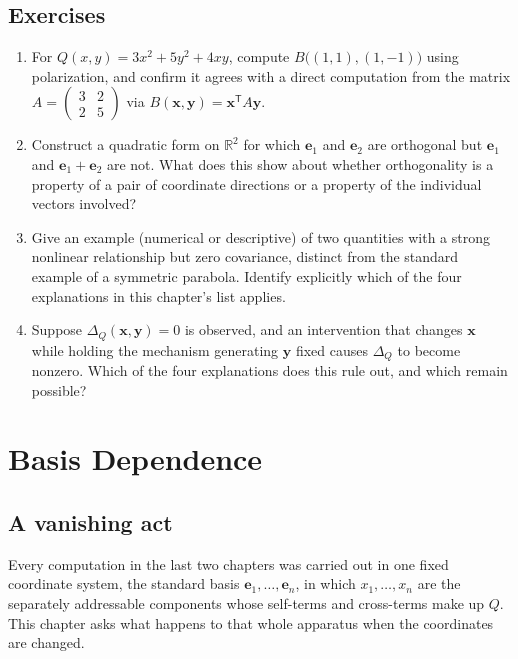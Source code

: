 \documentclass[11pt]{book}
\begin{document}
\section*{Exercises}
\begin{enumerate}
\item For $Q(x,y)=3x^2+5y^2+4xy$, compute $B\bigl((1,1),(1,-1)\bigr)$ using polarization, and confirm it agrees with a direct computation from the matrix $A=\begin{pmatrix}3&2\\2&5\end{pmatrix}$ via $B(\mathbf{x},\mathbf{y})=\mathbf{x}^{\mathsf T}A\mathbf{y}$.
\item Construct a quadratic form on $\mathbb{R}^2$ for which $\mathbf{e}_1$ and $\mathbf{e}_2$ are orthogonal but $\mathbf{e}_1$ and $\mathbf{e}_1+\mathbf{e}_2$ are not. What does this show about whether orthogonality is a property of a pair of coordinate directions or a property of the individual vectors involved?
\item Give an example (numerical or descriptive) of two quantities with a strong nonlinear relationship but zero covariance, distinct from the standard example of a symmetric parabola. Identify explicitly which of the four explanations in this chapter's list applies.
\item Suppose $\Delta_Q(\mathbf{x},\mathbf{y})=0$ is observed, and an intervention that changes $\mathbf{x}$ while holding the mechanism generating $\mathbf{y}$ fixed causes $\Delta_Q$ to become nonzero. Which of the four explanations does this rule out, and which remain possible?
\end{enumerate}

\chapter{Basis Dependence}

\section{A vanishing act}

Every computation in the last two chapters was carried out in one fixed coordinate system, the standard basis $\mathbf{e}_1,\ldots,\mathbf{e}_n$, in which $x_1,\ldots,x_n$ are the separately addressable components whose self-terms and cross-terms make up $Q$. This chapter asks what happens to that whole apparatus when the coordinates are changed.
\end{document}
